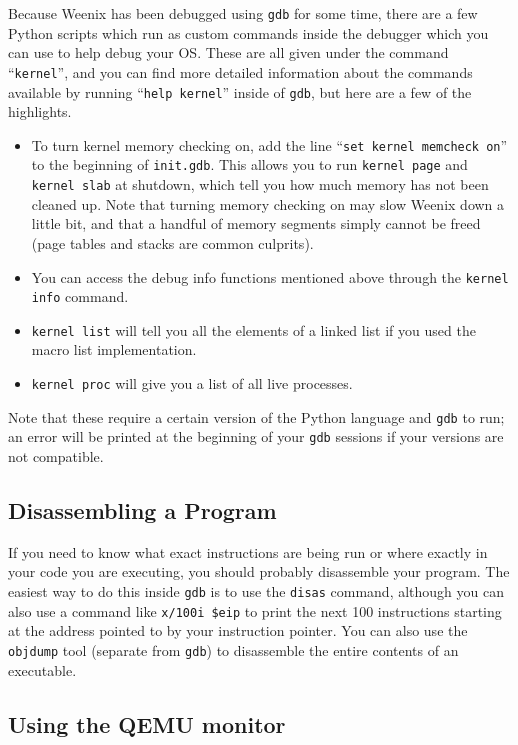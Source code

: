 Because Weenix has been debugged using \texttt{gdb} for some time, there are a few Python scripts which run as custom commands inside the debugger which you can use to help debug your OS. These are all given under the command ``\texttt{kernel}'', and you can find more detailed information about the commands available by running ``\texttt{help kernel}'' inside of \texttt{gdb}, but here are a few of the highlights.
\begin{itemize}
    \item To turn kernel memory checking on, add the line ``\texttt{set kernel memcheck on}'' to the beginning of \texttt{init.gdb}. This allows you to run \texttt{kernel page} and \texttt{kernel slab} at shutdown, which tell you how much memory has not been cleaned up. Note that turning memory checking on may slow Weenix down a little bit, and that a handful of memory segments simply cannot be freed (page tables and stacks are common culprits).
    \item You can access the debug info functions mentioned above through the \texttt{kernel info} command.
    \item \texttt{kernel list} will tell you all the elements of a linked list if you used the macro list implementation.
    \item \texttt{kernel proc} will give you a list of all live processes.
\end{itemize}
Note that these require a certain version of the Python language and \texttt{gdb} to run; an error will be printed at the beginning of your \texttt{gdb} sessions if your versions are not compatible.

\subsection{Disassembling a Program}

If you need to know what exact instructions are being run or where exactly in your code you are executing, you should probably disassemble your program. The easiest way to do this inside \texttt{gdb} is to use the \texttt{disas} command, although you can also use a command like \texttt{x/100i \$eip} to print the next 100 instructions starting at the address pointed to by your instruction pointer. You can also use the \texttt{objdump} tool (separate from \texttt{gdb}) to disassemble the entire contents of an executable.

\subsection{Using the QEMU monitor}

